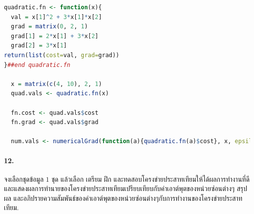 \begin{lstlisting}[language=R,caption={ตัวอย่างการเปรียบเทียบค่าเกรเดียนต์กับค่าประมาณเกรเดียนต์ด้วยวิธีเชิงเลข},
label={lst: ann app checkNumericalGrad02.r}]
quadratic.fn <- function(x){
  val = x[1]^2 + 3*x[1]*x[2]  
  grad = matrix(0, 2, 1)
  grad[1] = 2*x[1] + 3*x[2]
  grad[2] = 3*x[1]
return(list(cost=val, grad=grad))
}##end quadratic.fn

  x = matrix(c(4, 10), 2, 1)
  quad.vals <- quadratic.fn(x)

  fn.cost <- quad.vals$cost
  fn.grad <- quad.vals$grad

  num.vals <- numericalGrad(function(a){quadratic.fn(a)$cost}, x, epsilon=0.01)
\end{lstlisting}

\paragraph{12.}
จงเลือกชุดข้อมูล $1$ ชุด
แล้วเลือก เตรียม ฝึก และทดสอบโครงข่ายประสาทเทียมให้ได้ผลการทำงานที่ดี
และแสดงผลการทำนายของโครงข่ายประสาทเทียมเปรียบเทียบกับค่าเอาต์พุตของหน่วยซ่อนต่างๆ
สรุปผล และอภิปรายความสัมพันธ์ของค่าเอาต์พุตของหน่วยซ่อนต่างๆกับการทำงานของโครงข่ายประสาทเทียม.
